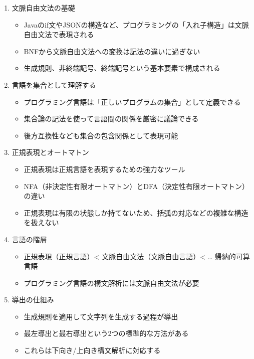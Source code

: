 \begin{enumerate}
\def\labelenumi{\arabic{enumi}.}
\item
  文脈自由文法の基礎

  \begin{itemize}
  \tightlist
  \item
    Javaのif文やJSONの構造など、プログラミングの「入れ子構造」は文脈自由文法で表現される
  \item
    BNFから文脈自由文法への変換は記法の違いに過ぎない
  \item
    生成規則、非終端記号、終端記号という基本要素で構成される
  \end{itemize}
\item
  言語を集合として理解する

  \begin{itemize}
  \tightlist
  \item
    プログラミング言語は「正しいプログラムの集合」として定義できる
  \item
    集合論の記法を使って言語間の関係を厳密に議論できる
  \item
    後方互換性なども集合の包含関係として表現可能
  \end{itemize}
\item
  正規表現とオートマトン

  \begin{itemize}
  \tightlist
  \item
    正規表現は正規言語を表現するための強力なツール
  \item
    NFA（非決定性有限オートマトン）とDFA（決定性有限オートマトン）の違い
  \item
    正規表現は有限の状態しか持てないため、括弧の対応などの複雑な構造を扱えない
  \end{itemize}
\item
  言語の階層

  \begin{itemize}
  \tightlist
  \item
    正規表現（正規言語）\textless{}
    文脈自由文法（文脈自由言語）\textless{} \ldots{} 帰納的可算言語
  \item
    プログラミング言語の構文解析には文脈自由文法が必要
  \end{itemize}
\item
  導出の仕組み

  \begin{itemize}
  \tightlist
  \item
    生成規則を適用して文字列を生成する過程が導出
  \item
    最左導出と最右導出という2つの標準的な方法がある
  \item
    これらは下向き/上向き構文解析に対応する
  \end{itemize}
\end{enumerate}

